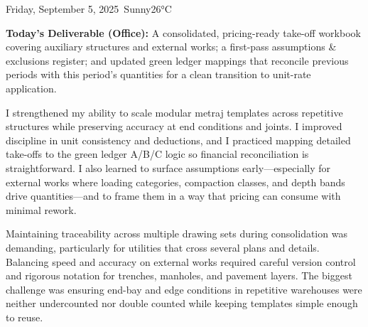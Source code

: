 \begin{dailyentry}{Friday, September 5, 2025}{\weathersunny\ Sunny}{26°C}
\begin{workcontent}
\begin{table}[ht]
\centering
\small
\caption{Quantity Reconciliation and Readiness Summary}
\end{table}

\textbf{Today’s Deliverable (Office):} A consolidated, pricing-ready take-off workbook covering auxiliary structures and external works; a first-pass assumptions \& exclusions register; and updated green ledger mappings that reconcile previous periods with this period’s quantities for a clean transition to unit-rate application.
\end{workcontent}

\begin{skillslearned}
\item[] I strengthened my ability to scale modular metraj templates across repetitive structures while preserving accuracy at end conditions and joints. I improved discipline in unit consistency and deductions, and I practiced mapping detailed take-offs to the green ledger A/B/C logic so financial reconciliation is straightforward. I also learned to surface assumptions early—especially for external works where loading categories, compaction classes, and depth bands drive quantities—and to frame them in a way that pricing can consume with minimal rework.
\end{skillslearned}

\begin{challenges}
\item[] Maintaining traceability across multiple drawing sets during consolidation was demanding, particularly for utilities that cross several plans and details. Balancing speed and accuracy on external works required careful version control and rigorous notation for trenches, manholes, and pavement layers. The biggest challenge was ensuring end-bay and edge conditions in repetitive warehouses were neither undercounted nor double counted while keeping templates simple enough to reuse.
\end{challenges}


\end{dailyentry}
